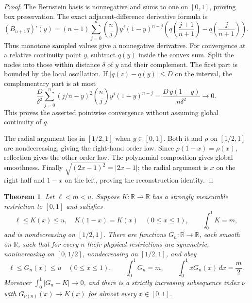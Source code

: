 \documentclass[11pt]{article}
\newtheorem{theorem}{Theorem}[section]
\newcommand{\R}{\mathbb R}
\begin{document}
\begin{proof}
The Bernstein basis is nonnegative and sums to one on $[0,1]$, proving
box preservation. The exact adjacent-difference derivative formula is
\[
 (B_{n+1}q)'(y)=(n+1)\sum_{j=0}^{n}\binom nj y^j(1-y)^{n-j}
 \left(q\left(\frac{j+1}{n+1}\right)-q\left(\frac j{n+1}\right)\right).
\]
Thus monotone sampled values give a nonnegative derivative.
For convergence at a relative continuity point $y$, subtract $q(y)$
inside the convex sum. Split the nodes into those within distance $\delta$
of $y$ and their complement. The first part is bounded by the local
oscillation. If $|q(z)-q(y)|\leq D$ on the interval, the complementary
part is at most
\[
 \frac{D}{\delta^2}\sum_{j=0}^n
   (j/n-y)^2\binom nj y^j(1-y)^{n-j}
 =\frac{D\,y(1-y)}{n\delta^2}\longrightarrow0.
\]
This proves the asserted pointwise convergence without assuming global
continuity of $q$.

The radial argument lies in $[1/2,1]$ when $y\in[0,1]$.
Both it and $\rho$ on $[1/2,1]$ are nondecreasing, giving the right-hand
order law. Since $\rho(1-x)=\rho(x)$, reflection gives the other order law.
The polynomial composition gives global smoothness. Finally
$\sqrt{(2x-1)^2}=|2x-1|$; the radial argument is $x$ on the right half
and $1-x$ on the left, proving the reconstruction identity.
\end{proof}

\begin{theorem}\label{thm:symmetric-exact-moment-recovery}
Let $\ell<m<u$. Suppose $K:\R\to\R$ has a strongly measurable
restriction to $[0,1]$ and satisfies
\[
 \ell\leq K(x)\leq u,\quad K(1-x)=K(x)\quad(0\leq x\leq1),
 \qquad \int_0^1K=m,
\]
and is nondecreasing on $[1/2,1]$.
There are functions $G_n:\R\to\R$, each smooth on $\R$, such that for
every $n$ their physical restrictions are symmetric, nonincreasing on
$[0,1/2]$, nondecreasing on $[1/2,1]$, and obey
\begin{equation}\label{eq:exact-moment-recovery}
 \ell\leq G_n(x)\leq u\quad(0\leq x\leq1),\qquad
 \int_0^1G_n=m,\qquad \int_0^1xG_n(x)\,dx=\frac m2.
\end{equation}
Moreover $\int_0^1|G_n-K|\to0$, and there is a strictly increasing
subsequence index $\nu$ with $G_{\nu(n)}(x)\to K(x)$ for almost every
$x\in[0,1]$.
\end{theorem}
\end{document}
